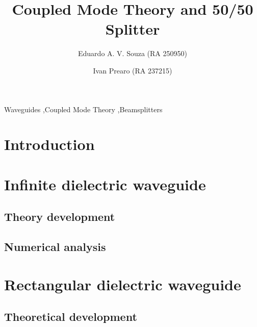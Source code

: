\documentclass[final,12pt,times,twocolumn,authoryear]{elsarticle}
\begin{document}
\begin{frontmatter}

\title{Coupled Mode Theory and 50/50 Splitter}

\author[1]{Eduardo A. V. Souza (RA 250950)}
\author[1]{Ivan Prearo (RA 237215)}


\begin{abstract}
    
\end{abstract}

\begin{keyword}
    Waveguides \sep Coupled Mode Theory \sep Beamsplitters
\end{keyword}


\end{frontmatter}

\section{Introduction}
\label{sec:intro}

\section{Infinite dielectric waveguide}
\label{sec:slab}

\subsection{Theory development}
\label{subsec:slab_theory}

\subsection{Numerical analysis}
\label{subsec:slab_num}

\section{Rectangular dielectric waveguide}
\label{subsec:rectangle}

\subsection{Theoretical development}
\label{subsec:rectangle_theory}
\end{document}
